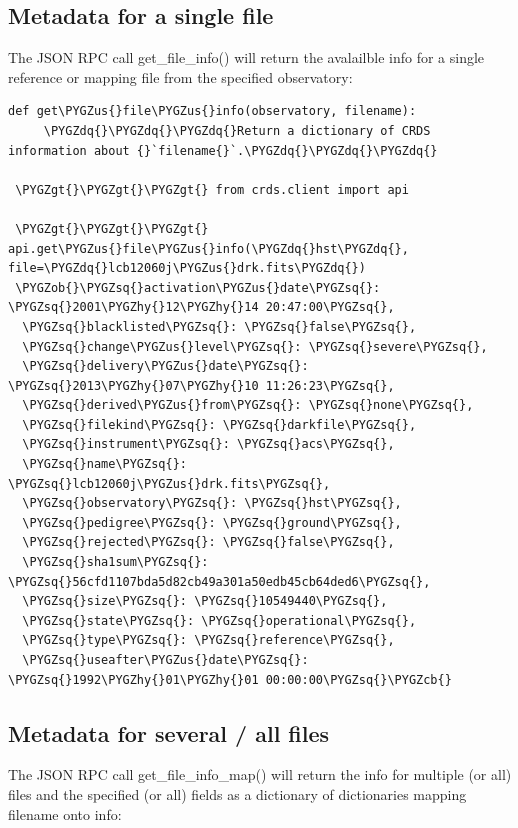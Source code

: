 \documentclass[letterpaper,10pt,english]{sphinxmanual}
\def\PYGZus{\char`\_}
\def\PYGZob{\char`\{}
\def\PYGZcb{\char`\}}
\def\PYGZgt{\char`\>}
\def\PYGZhy{\char`\-}
\def\PYGZsq{\char`\'}
\def\PYGZdq{\char`\"}
\begin{document}
\subsection{Metadata for a single file}
\label{database:metadata-for-a-single-file}
The JSON RPC call get\_file\_info() will return the avalailble info for a single reference
or mapping file from the specified observatory:

\begin{Verbatim}[commandchars=\\\{\}]
def get\PYGZus{}file\PYGZus{}info(observatory, filename):
     \PYGZdq{}\PYGZdq{}\PYGZdq{}Return a dictionary of CRDS information about {}`filename{}`.\PYGZdq{}\PYGZdq{}\PYGZdq{}

 \PYGZgt{}\PYGZgt{}\PYGZgt{} from crds.client import api

 \PYGZgt{}\PYGZgt{}\PYGZgt{} api.get\PYGZus{}file\PYGZus{}info(\PYGZdq{}hst\PYGZdq{}, file=\PYGZdq{}lcb12060j\PYGZus{}drk.fits\PYGZdq{})
 \PYGZob{}\PYGZsq{}activation\PYGZus{}date\PYGZsq{}: \PYGZsq{}2001\PYGZhy{}12\PYGZhy{}14 20:47:00\PYGZsq{},
  \PYGZsq{}blacklisted\PYGZsq{}: \PYGZsq{}false\PYGZsq{},
  \PYGZsq{}change\PYGZus{}level\PYGZsq{}: \PYGZsq{}severe\PYGZsq{},
  \PYGZsq{}delivery\PYGZus{}date\PYGZsq{}: \PYGZsq{}2013\PYGZhy{}07\PYGZhy{}10 11:26:23\PYGZsq{},
  \PYGZsq{}derived\PYGZus{}from\PYGZsq{}: \PYGZsq{}none\PYGZsq{},
  \PYGZsq{}filekind\PYGZsq{}: \PYGZsq{}darkfile\PYGZsq{},
  \PYGZsq{}instrument\PYGZsq{}: \PYGZsq{}acs\PYGZsq{},
  \PYGZsq{}name\PYGZsq{}: \PYGZsq{}lcb12060j\PYGZus{}drk.fits\PYGZsq{},
  \PYGZsq{}observatory\PYGZsq{}: \PYGZsq{}hst\PYGZsq{},
  \PYGZsq{}pedigree\PYGZsq{}: \PYGZsq{}ground\PYGZsq{},
  \PYGZsq{}rejected\PYGZsq{}: \PYGZsq{}false\PYGZsq{},
  \PYGZsq{}sha1sum\PYGZsq{}: \PYGZsq{}56cfd1107bda5d82cb49a301a50edb45cb64ded6\PYGZsq{},
  \PYGZsq{}size\PYGZsq{}: \PYGZsq{}10549440\PYGZsq{},
  \PYGZsq{}state\PYGZsq{}: \PYGZsq{}operational\PYGZsq{},
  \PYGZsq{}type\PYGZsq{}: \PYGZsq{}reference\PYGZsq{},
  \PYGZsq{}useafter\PYGZus{}date\PYGZsq{}: \PYGZsq{}1992\PYGZhy{}01\PYGZhy{}01 00:00:00\PYGZsq{}\PYGZcb{}
\end{Verbatim}


\subsection{Metadata for several / all files}
\label{database:metadata-for-several-all-files}
The JSON RPC call get\_file\_info\_map() will return the info for multiple (or all) files
and the specified (or all) fields as a dictionary of dictionaries mapping filename onto info:
\end{document}
